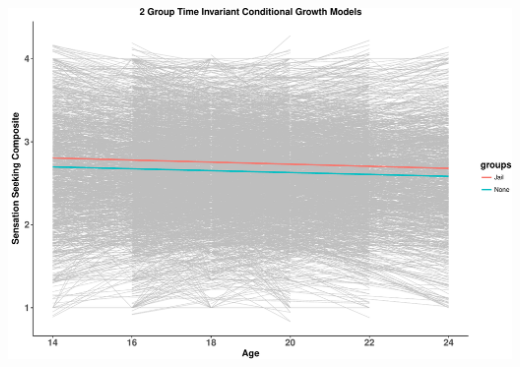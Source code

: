 \begin{frame}

\includegraphics{Conditional_Models_files/figure-beamer/unnamed-chunk-10-1.pdf}

\end{frame}

